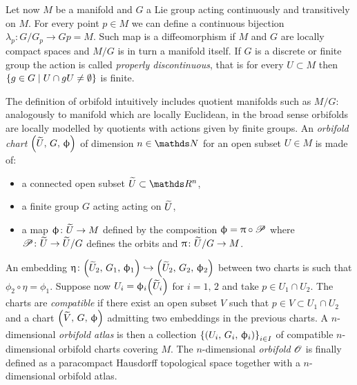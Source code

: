 Let now $M$ be a manifold and $G$ a Lie group acting continuously and transitively on $M$.
For every point $p \in M$ we can define a continuous bijection $\lambda_p \colon G / G_p \to Gp = M$.\footnotemark{}
Such map is a diffeomorphism if $M$ and $G$ are locally compact spaces and $M / G$ is in turn a manifold itself.
If $G$ is a discrete or finite group the action is called \emph{properly discontinuous}, that is for every $U \subset M$ then $\qty{ g \in G \mid U \cap g U \neq \emptyset }$ is finite.

The definition of orbifold intuitively includes quotient manifolds such as $M / G$: analogously to manifold which are locally Euclidean, in the broad sense orbifolds are locally modelled by quotients with actions given by finite groups.
An \emph{orbifold chart} $\qty( \widetilde{U},\, G,\, \upphi )$ of dimension $n \in \N$ for an open subset $U \in M$ is made of:
\begin{itemize}
  \item a connected open subset $\tildeU \subset \R^n$,

  \item a finite group $G$ acting acting on $\widetilde{U}$,

  \item a map $\upphi \colon \widetilde{U} \to M$ defined by the composition $\upphi = \uppi \circ \mathscr{P}$ where $\mathscr{P} \colon \widetilde{U} \to \widetilde{U} / G$ defines the orbits and $\uppi \colon \widetilde{U} / G \to M$.
\end{itemize}
An embedding $\upeta \colon \qty( \widetilde{U}_2,\, G_1,\, \upphi_1 ) \hookrightarrow \qty( \widetilde{U}_2,\, G_2,\, \upphi_2 )$ between two charts is such that $\phi_2 \circ \eta = \phi_1$.
Suppose now $U_i = \upphi_i\qty( \widetilde{U}_i )$ for $i = 1,\, 2$ and take $p \in U_1 \cap U_2$.
The charts are \emph{compatible} if there exist an open subset $V$ such that $p \in V \subset U_1 \cap U_2$ and a chart $\qty( \widetilde{V},\, G,\, \upphi )$ admitting two embeddings in the previous charts.
A $n$-dimensional \emph{orbifold atlas} is then a collection $\qty{ \qty( U_i,\, G_i,\, \phi_i ) }_{i \in I}$ of compatible $n$-dimensional orbifold charts covering $M$.
The $n$-dimensional \emph{orbifold} $\mathscr{O}$ is finally defined as a paracompact Hausdorff topological space together with a $n$-dimensional orbifold atlas.\footnotemark{}



